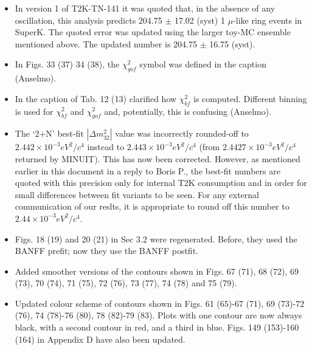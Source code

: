 \begin{itemize}
\item
In version 1 of T2K-TN-141 it was quoted that, in the absence of any oscillation,
this analysis predicts 204.75 $\pm$ 17.02 (syst) 1 $\mu$-like ring events in SuperK.
The quoted error was updated using the larger toy-MC ensemble mentioned above.
The updated number is 204.75 $\pm$ 16.75 (syst). \checkmark

\item
In Figs.
33 {\color{red}(37)}
34 {\color{red}(38)},
the $\chi^{2}_{gof}$ symbol was defined in the caption (Anselmo). \checkmark

\item
In the caption of Tab.
12 {\color{red}(13)}
clarified how $\chi^2_{bf}$ is computed. 
Different binning is used for $\chi^2_{bf}$ and $\chi^2_{gof}$
and, potentially, this is confusing  (Anselmo). \checkmark

\item
The `2+N' best-fit $|{\Delta}m^{2}_{32}|$ value was incorrectly rounded-off to
$2.442 \times 10^{-3} eV^2/c^4$ instead to $2.443 \times 10^{-3} eV^2/c^4$
(from $2.4427 \times 10^{-3} eV^2/c^4$ returned by MINUIT).
This has now been corrected.
However, as mentioned earlier in this document in a reply to Boris P.,
the best-fit numbers are quoted with this precision only for internal T2K
consumption and in order for small differences between fit variants to be seen.
For any external communication of our reslts, it is appropriate to round off 
this number to $2.44 \times 10^{-3} eV^2/c^4$. \checkmark

\item
Figs. 18  {\color{red}(19)} and 20  {\color{red}(21)} in Sec 3.2 were regenerated.
Before, they used the BANFF prefit; now they use the BANFF postfit.
\checkmark

\item
Added smoother versions of the contours shown in Figs.
67 {\color{red}(71)},
68 {\color{red}(72)},
69 {\color{red}(73)},
70 {\color{red}(74)},
71 {\color{red}(75)},
72 {\color{red}(76)},
73 {\color{red}(77)},
74 {\color{red}(78)} and
75 {\color{red}(79)}. \checkmark

\item
Updated colour scheme of contours shown in Figs.
61 {\color{red}(65)}-67 {\color{red}(71)},
69 {\color{red}(73)}-72 {\color{red}(76)},
74 {\color{red}(78)}-76 {\color{red}(80)},
78 {\color{red}(82)}-79 {\color{red}(83)}.
Plots with one contour are now always black, with a second contour in
red, and a third in blue.
Figs. 149 {\color{red}(153)}-160 {\color{red}(164)} in Appendix D have
also been updated.


\end{itemize}
